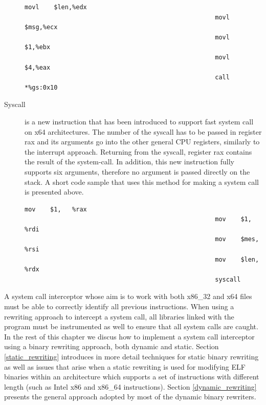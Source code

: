 \begin{description}
\lstset{escapechar=@,style=asm}
\begin{lstlisting}[label=list:vsdo,caption=Write system call invocation via VDSO gate on x86\_32 architecture.Note that the offset may change in a different platform.]
 												    movl    $len,%edx       
    												movl    $msg,%ecx       
  													movl    $1,%ebx        
  													movl    $4,%eax         
    												call    *%gs:0x10
\end{lstlisting}


\item[Syscall] is a new instruction that has been introduced to support fast system call on x64 architectures. The number of the syscall has to be passed in register rax and its arguments go into the other general CPU registers, similarly to the interrupt approach. Returning from the syscall, register rax contains the result of the system-call. In addition, this new instruction fully supports six arguments, therefore no argument is passed directly on the stack. A short code sample that uses this method for making a system call is presented above. 



\begin{center}
\lstset{escapechar=@,style=asm}
\label{list:syscall}
\begin{lstlisting}[caption=Write system call invocation via syscall on x64 architecture.]
 													mov    $1,   %rax          
													mov    $1,   %rdi         
													mov    $mes, %rsi     
													mov    $len, %rdx      
													syscall
\end{lstlisting}
\end{center}

\end{description}



A system call interceptor whose aim is to work with both x86\_32 and x64 files must be able to correctly identify all previous instructions. When using a rewriting approach to intercept a system call, all libraries linked with the program must be instrumented as well to ensure that all system calls are caught. In the rest of this chapter we discus how to implement a system call interceptor using a binary rewriting approach, both dynamic and static. Section \ref{static_rewriting} introduces in more detail techniques for static binary rewriting as well as issues that arise when a static rewriting is used for modifying ELF binaries within an architecture which supports  a set of instructions with different length (such as Intel x86 and x86\_64 instructions). Section \ref{dynamic_rewriting} presents the general approach adopted by most of the dynamic binary rewriters. 


